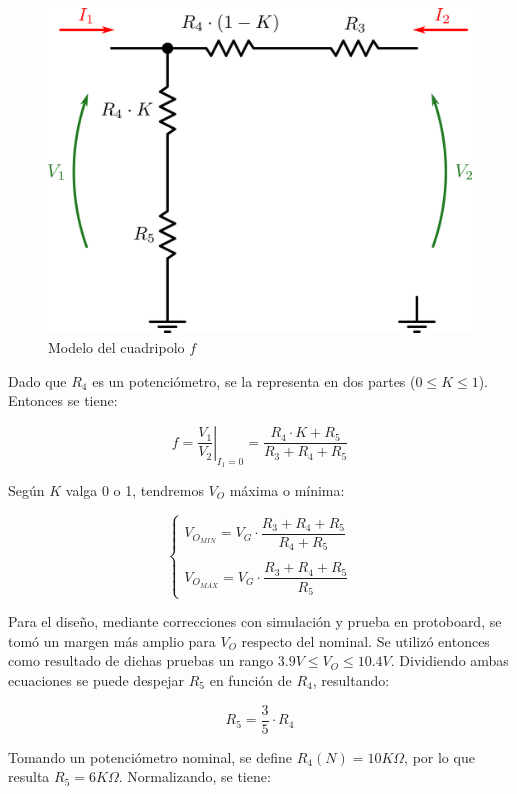 \begin{figure}[!h]
\begin{centering}
\includegraphics[scale=0.34]{Imagenes/CuadripoloF.png}
\par\end{centering}
\caption{Modelo del cuadripolo $f$}

\end{figure}

Dado que $R_4$ es un potenci\'ometro, se la representa en dos partes ($0 \leq K \leq 1$). Entonces se tiene:

$$f = \left. \frac{V_1}{V_2} \right|_{I_1=0} = \frac{R_4 \cdot K + R_5}{R_3 + R_4 + R_5}$$

Seg\'un $K$ valga 0 o 1, tendremos $V_O$ m\'axima o m\'inima:

$$
\left\lbrace
\begin{array}{l}
V_{O_{MIN}} = V_G \cdot \dfrac{R_3+R_4+R_5}{R_4+R_5}\\ \\
V_{O_{MAX}} = V_G \cdot \dfrac{R_3+R_4+R_5}{R_5}
\end{array}
\right.
$$

Para el dise\~no, mediante correcciones con simulaci\'on y prueba en protoboard, se tom\'o un margen m\'as amplio para $V_O$ respecto del nominal. Se utiliz\'o entonces como resultado de dichas pruebas un rango $3.9V \leq V_O \leq 10.4V$. Dividiendo ambas ecuaciones se puede despejar $R_5$ en funci\'on de $R_4$, resultando:

$$R_5 = \frac{3}{5} \cdot R_4$$

Tomando un potenci\'ometro nominal, se define $R_4(N) = 10K\Omega$, por lo que resulta $R_5 = 6K\Omega$. Normalizando, se tiene:

